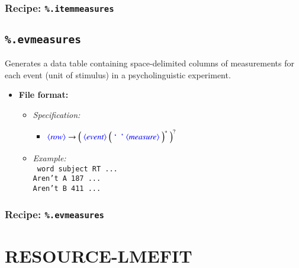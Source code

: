 \documentclass[12pt]{report}
\def\blue{\color{blue}}
\def\magenta{\color{magenta}}
\begin{document}
\subsection{Recipe: \blue\tt \%.itemmeasures}


\section{{\blue\tt \%.evmeasures}}

Generates a data table containing space-delimited columns of measurements for each event (unit of stimulus) in a psycholinguistic experiment.

\begin{itemize}
      \item \textbf{File format:}
      \begin{itemize}
            \item \textit{Specification:}\\
            \begin{itemize}
                  \item $\dtype{row} \rightarrow \Big( \ \dtype{event} \ \Big( \ \dcode{\ } \ \dtype{measure} \ \Big)^* \ \Big)^?$
            \end{itemize}
            \item \textit{Example:}\\
            {\magenta\tt
            word subject RT ...\\
            Aren't A 187 ...\\
            Aren't B 411 ...\\
            }
      \end{itemize}
\end{itemize}

\subsection{Recipe: \blue\tt \%.evmeasures}




\chapter{RESOURCE-LMEFIT}
\end{document}
